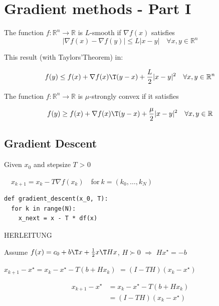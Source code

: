 \section{Gradient methods - Part I}

\begin{definition}[smoothness]
	The function $f : \mathbb{R}^{n}\rightarrow \mathbb{R}$ is $L$-smooth
	if $\nabla f(x)$ satisfies
	\[|\nabla f(x)-\nabla f(y)|\le L|x-y| \quad \forall x,y \in \mathbb{R}^{n}\]
\end{definition}

This result (with Taylors'Theorem) in:

\[f(y)\le f(x)+\nabla f(x)\T (y-x) +\frac{L}{2}|x-y|^2 \quad \forall x,y \in \mathbb{R}^{n}\]

\begin{definition}
	The function $f : \mathbb{R}^{n}\rightarrow \mathbb{R}$ is $\mu$-strongly convex
	if it satisfies

	\[f(y)\ge f(x)+\nabla f(x)\T (y-x) +\frac{\mu}{2}|x-y|^2 \quad \forall x,y \in \mathbb{R}^{}\]
\end{definition}

\subsection{Gradient Descent}

Given $x_0$ and stepsize $T$ > 0

$\quad x_{k+1}=x_k - T\nabla f(x_k)\quad$for$\ k = (k_0,\dots,k_N)$


\begin{verbatim}
def gradient_descent(x_0, T):
  for k in range(N):
    x_next = x - T * df(x)
\end{verbatim}

%

HERLEITUNG

Assume
$f(x)=c_0+b\T x+\frac{1}{2}x\T Hx$,
$H\succ0$
$\Rightarrow$
$Hx^\star =-b$

$x_{k+1}-x^\star=x_k-x^\star-T(b+Hx_k)$
$=(I-TH)(x_k-x^\star)$

\[\begin{align*}
		x_{k+1}-x^\star & =x_k-x^\star-T(b+Hx_k)
		\\
		                & =(I-TH)(x_k-x^\star)
	\end{align*}\]

